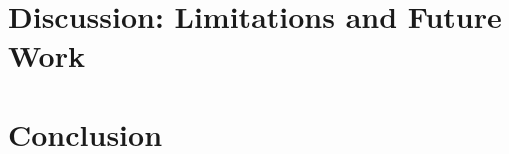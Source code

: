 \documentclass[conference]{IEEEtran}
\begin{document}


\section{Discussion: Limitations and Future Work}

\section{Conclusion}



\end{document}
